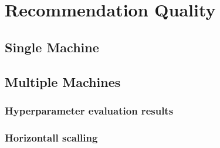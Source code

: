\section{Recommendation Quality}
\subsection{Single Machine}
\label{subsec:eval-single-machine}


\subsection{Multiple Machines}
\label{subsec:eval-multiple-machines}

\subsubsection{Hyperparameter evaluation results}
\label{subsubsec:eval-hyperparameter}

\subsubsection{Horizontall scalling}
\label{subsubsec:eval-horizontall-scalling}

